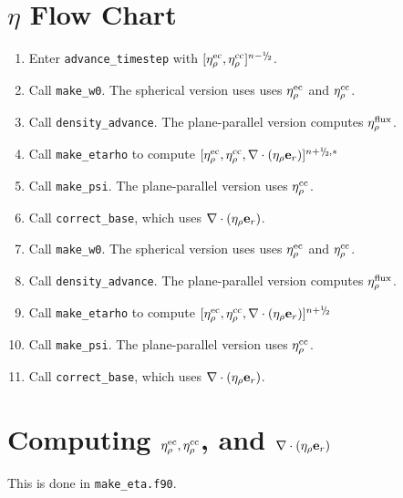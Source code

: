 \section{$\eta$ Flow Chart}
\begin{enumerate}
\item Enter {\tt advance\_timestep} with $[\etarhoec, \etarhocc]^{n-\myhalf}$.
\item Call {\tt make\_w0}.  The spherical version uses uses $\eta_{\rho}^{\rm ec}$ and $\eta_{\rho}^{\rm cc}$.
\item Call {\tt density\_advance}.  The plane-parallel version computes $\eta_{\rho}^{\rm flux}$.
\item Call {\tt make\_etarho} to compute $[\etarhoec, \etarhocc, \divetarho]^{n+\myhalf,*}$
\item Call {\tt make\_psi}.  The plane-parallel version uses $\eta_{\rho}^{\rm cc}$.
\item Call {\tt correct\_base}, which uses $\nabla\cdot(\eta_{\rho}{\bf e}_r)$.
\item Call {\tt make\_w0}.  The spherical version uses uses $\eta_{\rho}^{\rm ec}$ and $\eta_{\rho}^{\rm cc}$.
\item Call {\tt density\_advance}.  The plane-parallel version computes $\eta_{\rho}^{\rm flux}$.
\item Call {\tt make\_etarho} to compute $[\etarhoec, \etarhocc, \divetarho]^{n+\myhalf}$
\item Call {\tt make\_psi}.  The plane-parallel version uses $\eta_{\rho}^{\rm cc}$.
\item Call {\tt correct\_base}, which uses $\nabla\cdot(\eta_{\rho}{\bf e}_r)$.
\end{enumerate}

\section{Computing $\eta_{\rho}^{\rm ec}, \eta_{\rho}^{\rm cc}$, and $\nabla\cdot(\eta_{\rho}{\bf e}_r)$}
This is done in {\tt make\_eta.f90}.


